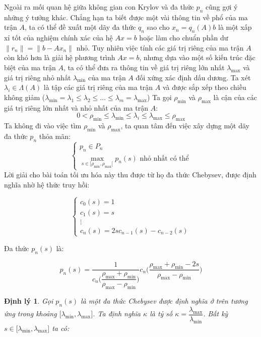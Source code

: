 \documentclass[14pt, a4paper]{article}
\numberwithin{equation}{section}
\numberwithin{algorithm}{section}
\numberwithin{figure}{section}
\newtheorem{dl}{Định lý}
\numberwithin{dl}{section}
\numberwithin{md}{section}
\numberwithin{bd}{section}
\numberwithin{dn}{section}
\numberwithin{hq}{section}
\begin{document}
\begin{enumerate}[a)]
    Ngoài ra mối quan hệ giữa không gian con Krylov và đa thức $p_n$ cũng gợi ý những ý tưởng khác. Chẳng hạn ta biết được một vài thông tin về phổ của ma trận $A$, ta có thể đề xuất một dãy đa thức $q_n$ sao cho $x_n = q_n(A)b$ là một xấp xỉ tốt của nghiệm chính xác của hệ $Ax=b$ hoặc làm cho chuẩn phần dư $\lVert r_n \rVert = \lVert b - Ax_n \rVert$ nhỏ.
    Tuy nhiên việc tính các giá trị riêng của ma trận $A$ còn khó hơn là giải hệ phương trình $Ax=b$, nhưng dựa vào một số kiến trúc đặc biệt của ma trận $A$, ta có thể đưa ra thông tin về giá trị riêng lớn nhất $\lambda_{\max}$ và giá trị riêng nhỏ nhất $\lambda_{\min}$ của ma trận $A$ đối xứng xác định dấu dương. Ta xét $\lambda_i \in \Lambda(A)$ là tập các giá trị riêng của ma trận $A$ và được sắp xếp theo chiều không giảm ($\lambda_{\min}=\lambda_1 \leq \lambda_2 \leq \dots \leq \lambda_m = \lambda_{\max}$)
    Ta gọi $\rho_{\min}$ và $\rho_{\max}$ là cận của các giá trị riêng lớn nhất và nhỏ nhất của ma trận $A$:
    \begin{equation}
        0 < \rho_{\min} \leq \lambda_{\min} \leq \lambda_i \leq \lambda_{\max} \leq \rho_{\max}
    \end{equation}
    Ta không đi vào việc tìm $\rho_{\min}$ và $\rho_{\max}$, ta quan tâm đến việc xây dựng một dãy đa thức $p_n$ thỏa mãn:
    \begin{equation}
        \begin{cases} p_n \in P_n \\ \underset{s \in \lbrack \rho_{\min}, \rho_{\max} \lbrack }{\max} p_n(s) \text{ nhỏ nhất có thể} \end{cases}
    \end{equation}
    Lời giải cho bài toán tối ưu hóa này thu được từ họ đa thức Chebysev, được định nghĩa nhờ hệ thức truy hồi:

    \begin{equation}
        \begin{cases} c_0(s)=1 \\ c_1(s)=s \\ \vdots \\ c_n(s)=2sc_{n-1}(s) - c_{n-2}(s) \end{cases}
    \end{equation}

    Đa thức $p_n(s)$ là:

    \begin{equation}
        p_n(s) = \dfrac{1}{c_n\Big(\dfrac{\rho_{\max} + \rho_{\min}}{\rho_{\max} - \rho_{\min}}\Big)}c_n \Big( \dfrac{\rho_{\max} + \rho_{\min} - 2s}{\rho_{\max} - \rho_{\min}} \Big)
    \end{equation}
    \begin{dl}
        Gọi $p_n(s)$ là một đa thức Chebysev được định nghĩa ở trên tương ứng trong khoảng $\lbrack \lambda_{\min}, \lambda_{\max} \rbrack$. Ta định nghĩa $\kappa$ là tỷ số $\kappa=\dfrac{\lambda_{\max}}{\lambda_{\min}}$. Bất kỳ $s \in \lbrack \lambda_{\min}, \lambda_{\max} \rbrack$ ta có:


\end{dl}
\end{enumerate}
\end{document}
